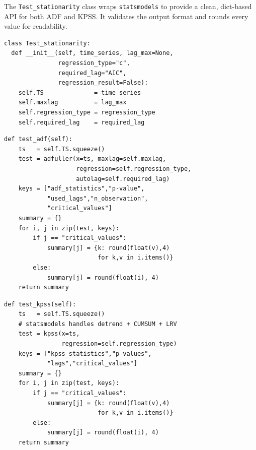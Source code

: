 \documentclass[10pt,a4paper,twocolumn]{article}
\begin{document}
The \texttt{Test\_stationarity} class wraps \texttt{statsmodels} to
provide a clean, dict-based API for both ADF and KPSS.  It validates
the output format and rounds every value for readability.

\begin{tcolorbox}[codebox={Constructor}]
\begin{lstlisting}[style=pythonplain]
class Test_stationarity:
  def __init__(self, time_series, lag_max=None,
               regression_type="c",
               required_lag="AIC",
               regression_result=False):
    self.TS              = time_series
    self.maxlag          = lag_max
    self.regression_type = regression_type
    self.required_lag    = required_lag
\end{lstlisting}
\end{tcolorbox}

\begin{tcolorbox}[codebox={\texttt{test\_adf()} --- wraps \texttt{statsmodels}}]
\begin{lstlisting}[style=pythonplain]
def test_adf(self):
    ts   = self.TS.squeeze()
    test = adfuller(x=ts, maxlag=self.maxlag,
                    regression=self.regression_type,
                    autolag=self.required_lag)
    keys = ["adf_statistics","p-value",
            "used_lags","n_observation",
            "critical_values"]
    summary = {}
    for i, j in zip(test, keys):
        if j == "critical_values":
            summary[j] = {k: round(float(v),4)
                          for k,v in i.items()}
        else:
            summary[j] = round(float(i), 4)
    return summary
\end{lstlisting}
\end{tcolorbox}

\begin{tcolorbox}[codebox={\texttt{test\_kpss()} --- Steps 1--4 via statsmodels}]
\begin{lstlisting}[style=pythonplain]
def test_kpss(self):
    ts   = self.TS.squeeze()
    # statsmodels handles detrend + CUMSUM + LRV
    test = kpss(x=ts,
                regression=self.regression_type)
    keys = ["kpss_statistics","p-values",
            "lags","critical_values"]
    summary = {}
    for i, j in zip(test, keys):
        if j == "critical_values":
            summary[j] = {k: round(float(v),4)
                          for k,v in i.items()}
        else:
            summary[j] = round(float(i), 4)
    return summary
\end{lstlisting}
\end{tcolorbox}
\end{document}
